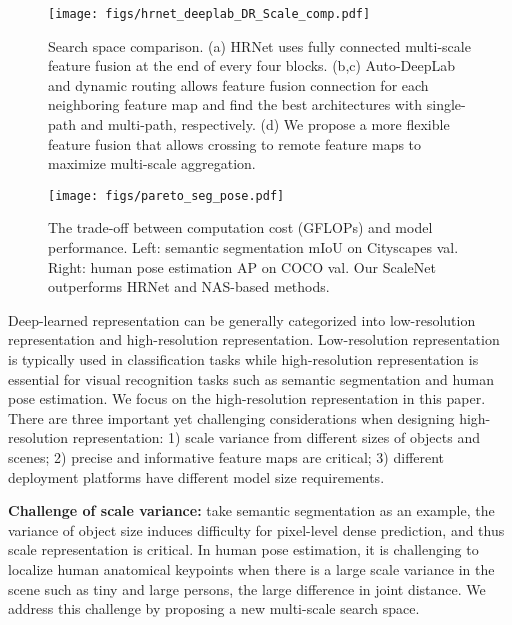 \documentclass[final]{cvpr}
\newcommand{\netname}{ScaleNet\xspace}
\begin{document}
\begin{figure}
    \centering
    \texttt{[image: figs/hrnet\_deeplab\_DR\_Scale\_comp.pdf]}
    \caption{
    Search space comparison. (a) HRNet uses fully connected multi-scale feature fusion at the end of every four blocks. (b,c) Auto-DeepLab and dynamic routing allows feature fusion connection for each neighboring feature map and find the best architectures with single-path and multi-path, respectively. (d) We propose a more flexible feature fusion that allows crossing to remote feature maps to maximize multi-scale aggregation.
    }\label{fig:comp_search_space}
\end{figure}

\begin{figure}[t]
    \centering
    \texttt{[image: figs/pareto\_seg\_pose.pdf]}
    \caption{The trade-off between computation cost (GFLOPs) and model performance. Left: semantic segmentation mIoU on Cityscapes val. Right: human pose estimation AP on COCO val. Our \netname outperforms HRNet and NAS-based methods.} 
\label{fig:pareto_seg_pose}
\end{figure}

Deep-learned representation can be generally categorized into low-resolution representation and high-resolution representation.
Low-resolution representation is typically used in classification tasks while
high-resolution representation is essential for visual recognition tasks such as semantic segmentation and human pose estimation. 
We focus on the high-resolution representation in this paper.
There are three important yet challenging considerations when designing high-resolution representation:
1) scale variance from different sizes of objects and scenes; 2) precise and informative feature maps are critical;
3) different deployment platforms have different model size requirements.

\textbf{Challenge of scale variance:}
take semantic segmentation as an example, the variance of object size induces difficulty for
pixel-level dense prediction, and thus scale representation is critical.
In human pose estimation, 
it is challenging to localize human anatomical keypoints when there is a large scale variance in the scene such as tiny and large persons, the large difference in joint distance. 
We address this challenge by proposing a new multi-scale search space.
\end{document}
